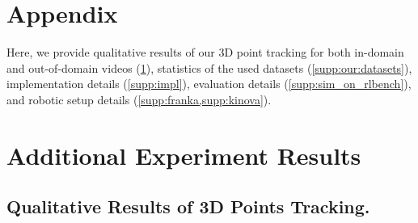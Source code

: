 \def\pretrainhyperparameters#1{
\begin{table}[H]
\caption{Training Hyperparameters for the three stages.}
\tablestyle{7.2 pt}{1.2}
\centering
\begin{tabular}{|l|l|l|l|}
\hline
\textbf{Hyperparameter} & \textbf{Stage 1} & \textbf{Stage 2} & \textbf{Stage 3} \\ \hline
Learning Rate           & $5 \times 10^{-4}$   & $5 \times 10^{-4}$ & $5 \times 10^{-3}$ \\ \hline
Weight Decay            & $1 \times 10^{-2}$   & $1 \times 10^{-2}$ & $1 \times 10^{-2}$ \\ \hline
Batch Size              & $256$                   & $256$ & $256$ \\ \hline
Number of Epochs       & 5                     & 20 & 10-50 \\ \hline
\end{tabular}
\vspace{-0.5 cm}
\label{tab:hyperparameters}
\end{table}
}

\section*{Appendix}

Here, we provide qualitative results of our 3D point tracking for both in-domain and out-of-domain videos (\cref{supp:expr}), statistics of the used datasets (\cref{supp:our:datasets}), implementation details (\cref{supp:impl}), evaluation details (\cref{supp:sim_on_rlbench}), and robotic setup details (\cref{supp:franka,supp:kinova}).  



\section{Additional Experiment Results}
\label{supp:expr}

\subsection{Qualitative Results of 3D Points Tracking.}
\label{supp:expr_qualitative}

